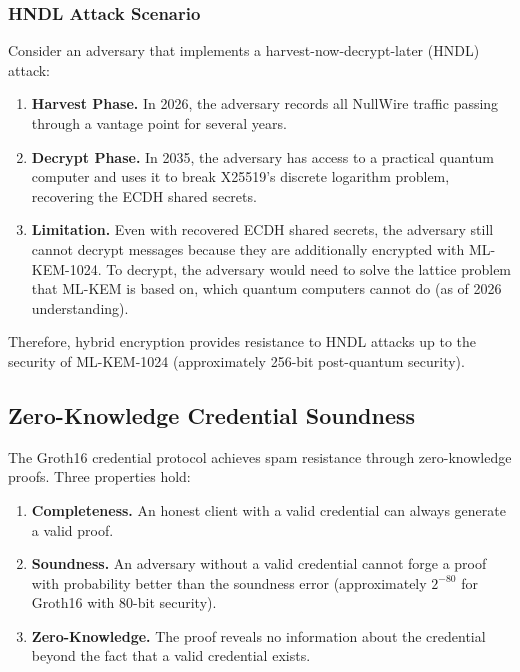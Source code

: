 \documentclass[11pt]{article}
\theoremstyle{definition}
\theoremstyle{remark}
\begin{document}
\subsubsection{HNDL Attack Scenario}

Consider an adversary that implements a harvest-now-decrypt-later (HNDL) attack:

\begin{enumerate}
    \item \textbf{Harvest Phase.} In 2026, the adversary records all NullWire traffic passing through a vantage point for several years.

    \item \textbf{Decrypt Phase.} In 2035, the adversary has access to a practical quantum computer and uses it to break X25519's discrete logarithm problem, recovering the ECDH shared secrets.

    \item \textbf{Limitation.} Even with recovered ECDH shared secrets, the adversary still cannot decrypt messages because they are additionally encrypted with ML-KEM-1024. To decrypt, the adversary would need to solve the lattice problem that ML-KEM is based on, which quantum computers cannot do (as of 2026 understanding).
\end{enumerate}

Therefore, hybrid encryption provides resistance to HNDL attacks up to the security of ML-KEM-1024 (approximately 256-bit post-quantum security).

\subsection{Zero-Knowledge Credential Soundness}
\label{subsec:zk-soundness}

The Groth16 credential protocol achieves spam resistance through zero-knowledge proofs. Three properties hold:

\begin{enumerate}
    \item \textbf{Completeness.} An honest client with a valid credential can always generate a valid proof.

    \item \textbf{Soundness.} An adversary without a valid credential cannot forge a proof with probability better than the soundness error (approximately $2^{-80}$ for Groth16 with 80-bit security).

    \item \textbf{Zero-Knowledge.} The proof reveals no information about the credential beyond the fact that a valid credential exists.
\end{enumerate}
\end{document}
